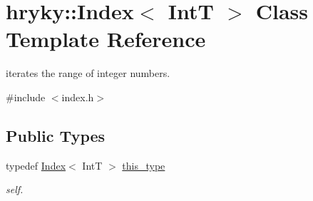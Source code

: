 \hypertarget{classhryky_1_1_index}{\section{hryky\-:\-:Index$<$ Int\-T $>$ Class Template Reference}
\label{classhryky_1_1_index}
}


iterates the range of integer numbers.  




{\ttfamily \#include $<$index.\-h$>$}

\subsection*{Public Types}
\begin{DoxyCompactItemize}
\item 
\hypertarget{classhryky_1_1_index_a0dab4f087ed4d752f8d5040163782102}{typedef \hyperlink{classhryky_1_1_index}{Index}$<$ Int\-T $>$ \hyperlink{classhryky_1_1_index_a0dab4f087ed4d752f8d5040163782102}{this\-\_\-type}}\label{classhryky_1_1_index_a0dab4f087ed4d752f8d5040163782102}

\begin{DoxyCompactList}\small\item\em self. \end{DoxyCompactList}\end{DoxyCompactItemize}
